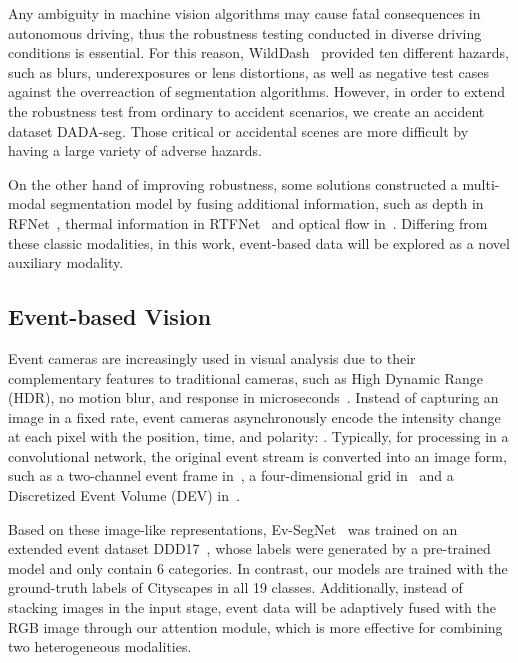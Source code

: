 \documentclass[letterpaper, 10 pt, conference]{ieeeconf}
\begin{document}
Any ambiguity in machine vision algorithms may cause fatal consequences in autonomous driving, thus the robustness testing conducted in diverse driving conditions is essential. For this reason, WildDash~\cite{zendel2018wilddash} provided ten different hazards, such as blurs, underexposures or lens distortions, as well as negative test cases against the overreaction of segmentation algorithms. 
However, in order to extend the robustness test from ordinary to accident scenarios, we create an accident dataset DADA-seg. Those critical or accidental scenes are more difficult by having a large variety of adverse hazards. 

On the other hand of improving robustness, some solutions constructed a multi-modal segmentation model by fusing additional information, such as depth in RFNet~\cite{sun2020rfnet}, thermal information in RTFNet~\cite{Y2019RTFNet_rgb_thermal} and optical flow in~\cite{rashed2019optical_flow}. Differing from these classic modalities, in this work, event-based data will be explored as a novel auxiliary modality.

\subsection{Event-based Vision}
Event cameras are increasingly used in visual analysis due to their complementary features to traditional cameras, such as High Dynamic Range (HDR), no motion blur, and response in microseconds~\cite{gallego2019event_survey}. Instead of capturing an image in a fixed rate, event cameras asynchronously encode the intensity change at each pixel with the position, time, and polarity: . Typically, for processing in a convolutional network, the original event stream is converted into an image form,
such as a two-channel event frame in~\cite{maqueda2018eventframe_2channel}, a four-dimensional grid in~\cite{zhu2018ev-flownet} and a Discretized Event Volume (DEV) in~\cite{zhu2019unsupervised}.

Based on these image-like representations, Ev-SegNet~\cite{alonso2019Ev-SegNet} was trained on an extended event dataset DDD17~\cite{binas2017ddd17}, whose labels were generated by a pre-trained model and only contain 6 categories. In contrast, our models are trained with the ground-truth labels of Cityscapes in all 19 classes. Additionally, instead of stacking images in the input stage, event data will be adaptively fused with the RGB image through our attention module, which is more effective for combining two heterogeneous modalities.
\end{document}

